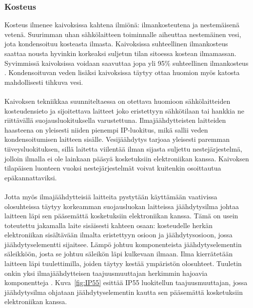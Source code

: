 \documentclass[finnish,12pt,a4paper,pdftex,elec,utf8]{aaltothesis}
\begin{document}
\subsubsection{Kosteus}
Kosteus ilmenee kaivoksissa kahtena ilmiönä: ilmankosteutena ja nestemäisenä vetenä. Suurimman uhan sähkölaitteen toiminnalle aiheuttaa nestemäinen vesi, jota kondensoituu kosteasta ilmasta. Kaivoksissa suhteellinen ilmankosteus saattaa nousta hyvinkin korkeaksi suljetun tilan sitoessa kostean ilmamassan.  Syvimmissä kaivoksissa voidaan saavuttaa jopa yli 95\% suhteellinen ilmankosteus \cite{manchao}. Kondensoituvan veden lisäksi kaivoksissa täytyy ottaa huomion myös katosta mahdollisesti tihkuva vesi.
\\\\
Kaivoksen tekniikkaa suunniteltaessa on otettava huomioon sähkölaitteiden kosteudensieto ja sijoitettava laitteet joko eristettyyn sähkötilaan tai hankkia ne riittävällä suojausluokituksella varustettuna. Ilmajäähdytteisten laitteiden haasteena on yleisesti niiden pienempi IP-luokitus, mikä sallii veden kondensoitumisen laitteen sisälle\cite{Pallasmaa}. Vesijäähdytys tarjoaa yleisesti paremman tiiveysluokituksen, sillä laitetta viilentää ilman sijasta suljettu nestejärjestelmä, jolloin ilmalla ei ole lainkaan pääsyä kosketuksiin elektroniikan kanssa. Kaivoksen tilapäisen luonteen vuoksi nestejärjestelmät voivat kuitenkin osoittautua epäkannattaviksi.
\\\\
Jotta myös ilmajäähdytteisiä laitteita pystytään käyttämään vaativissa olosuhteissa täytyy korkeamman suojausluokan laitteissa jäähdytysilma johtaa laitteen läpi sen pääsemättä kosketuksiin elektroniikan kanssa. Tämä on usein toteutettu jakamalla laite sisäisesti kahteen osaan: kosteudelle herkän elektroniikan sisältävään ilmalta eristettyyn osioon ja jäähdytysosioon, jossa jäähdytyselementti  sijaitsee.  Lämpö johtuu komponenteista jäähdytyselementin säleikköön, josta se johtuu säleikön läpi kulkevaan ilmaan. Ilma kierrätetään laitteen läpi tuulettimilla, joiden täytyy kestää ympäristön olosuhteet. Tuuletin onkin yksi ilmajäähdytteisen taajuusmuuttajan herkimmin hajoavia komponentteja \cite{Muttilainen}. Kuva~\ref{fig:IP55} esittää IP55 luokitellun taajuusmuuttajan, jossa jäähdytysilma ohjataan jäähdytyselementin kautta sen pääsemättä kosketuksiin elektroniikan kanssa.
\end{document}
